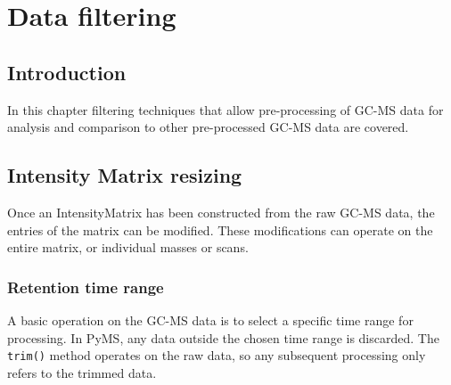 

\chapter{Data filtering}

\section{Introduction}
In this chapter filtering techniques that allow pre-processing of
GC-MS data for analysis and comparison to other pre-processed GC-MS data are
covered.

\section{Intensity Matrix resizing}

Once an IntensityMatrix has been constructed from the raw GC-MS data, the
entries of the matrix can be modified. These modifications can operate on the
entire matrix, or individual masses or scans.

\subsection{Retention time range}


A basic operation on the GC-MS data is to select a specific time range for
processing. In PyMS, any data outside the chosen time range is discarded. The
{\tt trim()} method operates on the raw data, so any subsequent processing only
refers to the trimmed data.


